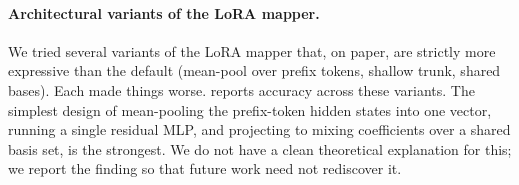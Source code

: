 \documentclass{article}
\theoremstyle{plain}
\theoremstyle{definition}
\theoremstyle{remark}
\begin{document}

\paragraph{Architectural variants of the LoRA mapper.}
\label{sec:ablation_mapper_design}
We tried several variants of the LoRA mapper that, on paper, are strictly more expressive than the default (mean-pool over prefix tokens, shallow trunk, shared bases). Each made things worse.  reports accuracy across these variants. The simplest design of mean-pooling the prefix-token hidden states into one vector, running a single residual MLP, and projecting to mixing coefficients over a shared basis set, is the strongest. We do not have a clean theoretical explanation for this; we report the finding so that future work need not rediscover it.
\end{document}
